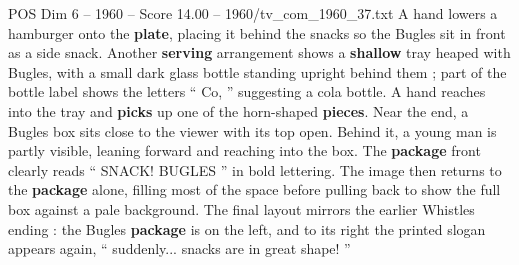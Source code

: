\begin{textsample}{POS Dim 6 – 1960 – Score 14.00 – 1960/tv\_com\_1960\_37.txt}
A hand lowers a hamburger onto the \textbf{plate}, placing it behind the snacks so the Bugles sit in front as a side snack.
Another \textbf{serving} arrangement shows a \textbf{shallow} tray heaped with Bugles, with a small dark glass bottle standing upright behind them ; part of the bottle label shows the letters “ Co, ” suggesting a cola bottle.
A hand reaches into the tray and \textbf{picks} up one of the horn-shaped \textbf{pieces}.
Near the end, a Bugles box sits close to the viewer with its top open.
Behind it, a young man is partly visible, leaning forward and reaching into the box.
The \textbf{package} front clearly reads “ SNACK!
BUGLES ” in bold lettering.
The image then returns to the \textbf{package} alone, filling most of the space before pulling back to show the full box against a pale background.
The final layout mirrors the earlier Whistles ending : the Bugles \textbf{package} is on the left, and to its right the printed slogan appears again, “ suddenly... snacks are in great shape! ”

\end{textsample}
